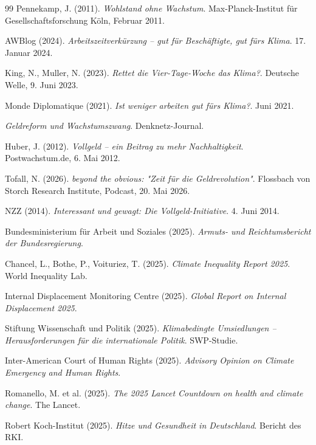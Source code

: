 \documentclass[12pt, a4paper]{article}
\begin{document}
\begin{thebibliography}{99}
		Pennekamp, J. (2011). \textit{Wohlstand ohne Wachstum}. Max-Planck-Institut für
		Gesellschaftsforschung Köln, Februar 2011.
		
		AWBlog (2024). \textit{Arbeitszeitverkürzung – gut für Beschäftigte, gut fürs
			Klima}. 17. Januar 2024.
		
		King, N., Muller, N. (2023). \textit{Rettet die Vier-Tage-Woche das Klima?}.
		Deutsche Welle, 9. Juni 2023.
		
		Monde Diplomatique (2021). \textit{Ist weniger arbeiten gut fürs Klima?}.
		Juni 2021.
		
		\textit{Geldreform und Wachstumszwang}. Denknetz-Journal.
		
		Huber, J. (2012). \textit{Vollgeld – ein Beitrag zu mehr Nachhaltigkeit}.
		Postwachstum.de, 6. Mai 2012.
		
		Tofall, N. (2026). \textit{beyond the obvious: "Zeit für die Geldrevolution"}.
		Flossbach von Storch Research Institute, Podcast, 20. Mai 2026.
		
		NZZ (2014). \textit{Interessant und gewagt: Die Vollgeld-Initiative}. 4. Juni 2014.
		
		Bundesministerium für Arbeit und Soziales (2025). \textit{Armuts- und Reichtumsbericht der Bundesregierung}.
		
		Chancel, L., Bothe, P., Voituriez, T. (2025). \textit{Climate Inequality Report 2025}. World Inequality Lab.
		
		Internal Displacement Monitoring Centre (2025). \textit{Global Report on Internal Displacement 2025}.
		
		Stiftung Wissenschaft und Politik (2025). \textit{Klimabedingte Umsiedlungen – Herausforderungen für die internationale Politik}. SWP-Studie.
		
		Inter-American Court of Human Rights (2025). \textit{Advisory Opinion on Climate Emergency and Human Rights}.
		
		Romanello, M. et al. (2025). \textit{The 2025 Lancet Countdown on health and climate change}. The Lancet.
		
		Robert Koch-Institut (2025). \textit{Hitze und Gesundheit in Deutschland}. Bericht des RKI.
		

\end{thebibliography}
\end{document}
